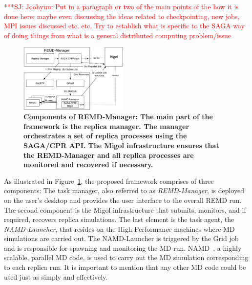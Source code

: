 \documentclass{rspublic}
\newcommand{\up}{}%
\newcommand{\upp}{}%
\newcommand{\jhanote}[1]{ {\textcolor{red} { ***SJ: #1 }}}
\newcommand{\jhanote}[1]{}
\begin{document}
\jhanote{Joohyun: Put in a paragraph or two of the main points of the
  how it is done here; maybe even discussing the ideas related to
  checkpointing, new jobs, MPI issues discussed etc. etc. Try to
  establish what is specific to the SAGA way of doing things from what
  is a general distributed computing problem/issue}

\begin{figure}[ht]
      \centering
          \includegraphics[width=0.48\textwidth]{REMDgManager-architecture.pdf}
          \up\upp
          \caption{\footnotesize \bf Components of REMD-Manager: The main part of the
            framework is the replica manager. The manager orchestrates
            a set of replica processes using the SAGA/CPR API. The
            Migol infrastructure ensures that the REMD-Manager and all
            replica processes are monitored and recovered if
            necessary.}
            \upp
      \label{fig:REMD-Manager-architecture}
\end{figure}

As illustrated in Figure~\ref{fig:REMD-Manager-architecture}, the
proposed framework comprises of three components: The task manager,
also referred to as \emph{REMD-Manager}, is deployed on the user's
desktop and provides the user interface to the overall REMD run. The
second component is the Migol infrastructure that submits, monitors,
and if required, recovers replica simulations.  The last element is
the task agent, the \emph{NAMD-Launcher}, that resides on the High
Performance machines where MD simulations are carried out. The
NAMD-Launcher is triggered by the Grid job and is responsible for
spawning and monitoring the MD run. NAMD~\cite{Phillips:2005gd}, a
highly scalable, parallel MD code, is used to carry out the MD
simulation corresponding to each replica run. It is important to
mention that any other MD code could be used just as simply and
effectively.

\end{document}
